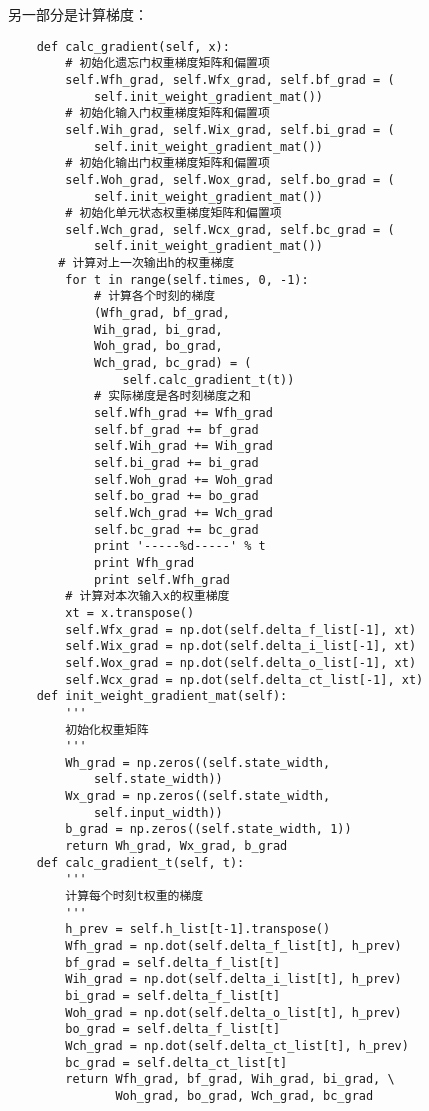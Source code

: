 另一部分是计算梯度：
\begin{lstlisting}
    def calc_gradient(self, x):
        # 初始化遗忘门权重梯度矩阵和偏置项
        self.Wfh_grad, self.Wfx_grad, self.bf_grad = (
            self.init_weight_gradient_mat())
        # 初始化输入门权重梯度矩阵和偏置项
        self.Wih_grad, self.Wix_grad, self.bi_grad = (
            self.init_weight_gradient_mat())
        # 初始化输出门权重梯度矩阵和偏置项
        self.Woh_grad, self.Wox_grad, self.bo_grad = (
            self.init_weight_gradient_mat())
        # 初始化单元状态权重梯度矩阵和偏置项
        self.Wch_grad, self.Wcx_grad, self.bc_grad = (
            self.init_weight_gradient_mat())
       # 计算对上一次输出h的权重梯度
        for t in range(self.times, 0, -1):
            # 计算各个时刻的梯度
            (Wfh_grad, bf_grad,
            Wih_grad, bi_grad,
            Woh_grad, bo_grad,
            Wch_grad, bc_grad) = (
                self.calc_gradient_t(t))
            # 实际梯度是各时刻梯度之和
            self.Wfh_grad += Wfh_grad
            self.bf_grad += bf_grad
            self.Wih_grad += Wih_grad
            self.bi_grad += bi_grad
            self.Woh_grad += Woh_grad
            self.bo_grad += bo_grad
            self.Wch_grad += Wch_grad
            self.bc_grad += bc_grad
            print '-----%d-----' % t
            print Wfh_grad
            print self.Wfh_grad
        # 计算对本次输入x的权重梯度
        xt = x.transpose()
        self.Wfx_grad = np.dot(self.delta_f_list[-1], xt)
        self.Wix_grad = np.dot(self.delta_i_list[-1], xt)
        self.Wox_grad = np.dot(self.delta_o_list[-1], xt)
        self.Wcx_grad = np.dot(self.delta_ct_list[-1], xt)
    def init_weight_gradient_mat(self):
        '''
        初始化权重矩阵
        '''
        Wh_grad = np.zeros((self.state_width,
            self.state_width))
        Wx_grad = np.zeros((self.state_width,
            self.input_width))
        b_grad = np.zeros((self.state_width, 1))
        return Wh_grad, Wx_grad, b_grad
    def calc_gradient_t(self, t):
        '''
        计算每个时刻t权重的梯度
        '''
        h_prev = self.h_list[t-1].transpose()
        Wfh_grad = np.dot(self.delta_f_list[t], h_prev)
        bf_grad = self.delta_f_list[t]
        Wih_grad = np.dot(self.delta_i_list[t], h_prev)
        bi_grad = self.delta_f_list[t]
        Woh_grad = np.dot(self.delta_o_list[t], h_prev)
        bo_grad = self.delta_f_list[t]
        Wch_grad = np.dot(self.delta_ct_list[t], h_prev)
        bc_grad = self.delta_ct_list[t]
        return Wfh_grad, bf_grad, Wih_grad, bi_grad, \
               Woh_grad, bo_grad, Wch_grad, bc_grad
\end{lstlisting}

